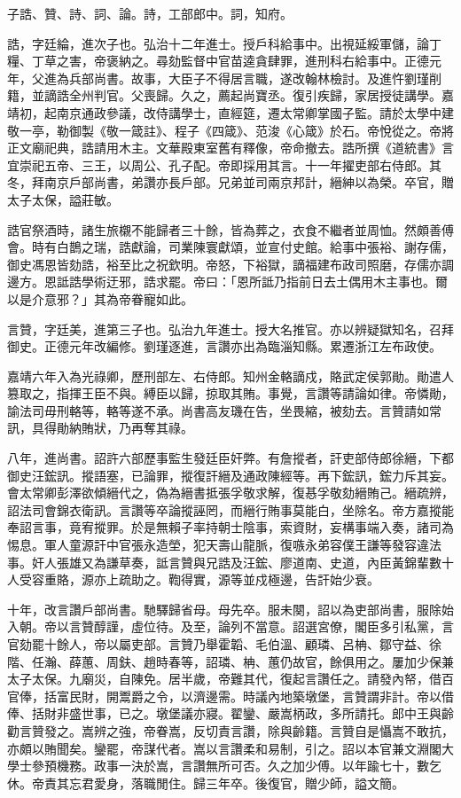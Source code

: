 \begin{pinyinscope}
子誥、贊、詩、詞、論。詩，工部郎中。詞，知府。

誥，字廷綸，進次子也。弘治十二年進士。授戶科給事中。出視延綏軍儲，論丁糧、丁草之害，帝褒納之。尋劾監督中官苗逵貪肆罪，進刑科右給事中。正德元年，父進為兵部尚書。故事，大臣子不得居言職，遂改翰林檢討。及進忤劉瑾削籍，並謫誥全州判官。父喪歸。久之，薦起尚寶丞。復引疾歸，家居授徒講學。嘉靖初，起南京通政參議，改侍講學士，直經筵，遷太常卿掌國子監。請於太學中建敬一亭，勒御製《敬一箴註》、程子《四箴》、范浚《心箴》於石。帝悅從之。帝將正文廟祀典，誥請用木主。文華殿東室舊有釋像，帝命撤去。誥所撰《道統書》言宜崇祀五帝、三王，以周公、孔子配。帝即採用其言。十一年擢吏部右侍郎。其冬，拜南京戶部尚書，弟讚亦長戶部。兄弟並司兩京邦計，縉紳以為榮。卒官，贈太子太保，謚莊敏。

誥官祭酒時，諸生旅櫬不能歸者三十餘，皆為葬之，衣食不繼者並周恤。然頗善傅會。時有白鵲之瑞，誥獻論，司業陳寰獻頌，並宣付史館。給事中張裕、謝存儒，御史馮恩皆劾誥，裕至比之祝欽明。帝怒，下裕獄，謫福建布政司照磨，存儒亦調邊方。恩詆誥學術迂邪，誥求罷。帝曰：「恩所詆乃指前日去土偶用木主事也。爾以是介意邪？」其為帝眷寵如此。

言贊，字廷美，進第三子也。弘治九年進士。授大名推官。亦以辨疑獄知名，召拜御史。正德元年改編修。劉瑾逐進，言讚亦出為臨淄知縣。累遷浙江左布政使。

嘉靖六年入為光祿卿，歷刑部左、右侍郎。知州金輅謫戍，賂武定侯郭勛。勛遣人篡取之，指揮王臣不與。縛臣以歸，掠取其賄。事覺，言讚等請論如律。帝憐勛，諭法司毋刑輅等，輅等遂不承。尚書高友璣在告，坐畏縮，被劾去。言贊請如常訊，具得勛納賄狀，乃再奪其祿。

八年，進尚書。詔許六部歷事監生發廷臣奸弊。有詹摐者，訐吏部侍郎徐縉，下都御史汪鋐訊。摐語塞，已論罪，摐復訐縉及通政陳經等。再下鋐訊，鋐力斥其妄。會太常卿彭澤欲傾縉代之，偽為縉書抵張孚敬求解，復惎孚敬劾縉賄己。縉疏辨，詔法司會錦衣衛訊。言讚等卒論摐誣罔，而縉行賄事莫能白，坐除名。帝方嘉摐能奉詔言事，竟宥摐罪。於是無賴子率持朝士陰事，索資財，妄構事端入奏，諸司為惕息。軍人童源訐中官張永造塋，犯天壽山龍脈，復嗾永弟容僕王謙等發容違法事。奸人張雄又為謙草奏，詆言贊與兄誥及汪鋐、廖道南、史道，內臣黃錦輩數十人受容重賂，源亦上疏助之。鞫得實，源等並戍極邊，告訐始少衰。

十年，改言讚戶部尚書。馳驛歸省母。母先卒。服未闋，詔以為吏部尚書，服除始入朝。帝以言贊醇謹，虛位待。及至，論列不當意。詔選宮僚，閣臣多引私黨，言官劾罷十餘人，帝以屬吏部。言贊乃舉霍韜、毛伯溫、顧璘、呂柟、鄒守益、徐階、任瀚、薛蕙、周鈇、趙時春等，詔璘、柟、蕙仍故官，餘俱用之。屢加少保兼太子太保。九廟災，自陳免。居半歲，帝難其代，復起言讚任之。請發內帑，借百官俸，括富民財，開鬻爵之令，以濟邊需。時議內地築墩堡，言贊謂非計。帝以借俸、括財非盛世事，已之。墩堡議亦寢。翟鑾、嚴嵩柄政，多所請托。郎中王與齡勸言贊發之。嵩辨之強，帝眷嵩，反切責言讚，除與齡籍。言贊自是懾嵩不敢抗，亦頗以賄聞矣。鑾罷，帝謀代者。嵩以言讚柔和易制，引之。詔以本官兼文淵閣大學士參預機務。政事一決於嵩，言讚無所可否。久之加少傅。以年踰七十，數乞休。帝責其忘君愛身，落職閒住。歸三年卒。後復官，贈少師，謚文簡。


\end{pinyinscope}
